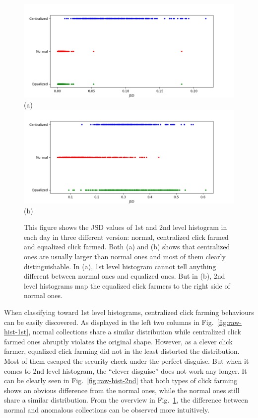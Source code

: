 \documentclass[10pt,conference,letterpaper]{IEEEtran}
\begin{document}
			\begin{figure}[!ht]
				\centering
				\includegraphics[width=\linewidth]{fig/RawOverview1st.png}
				(a)
				\includegraphics[width=\linewidth]{fig/RawOverview2nd.png}
				(b)
				\caption{This figure shows the JSD values of 1st and 2nd level histogram in each day in three different version: normal, centralized click farmed and equalized click farmed. Both (a) and (b) shows that centralized ones are usually larger than normal ones and most of them clearly distinguishable. In (a), 1st level histogram cannot tell anything different between normal ones and equalized ones. But in (b), 2nd level histograms map the equalized click farmers to the right side of normal ones.}
				\label{fig:raw-overview}
			\end{figure}
	
			When classifying toward 1st level histograms, centralized click farming behaviours can be easily discovered. As displayed in the left two columns in Fig.~\ref{fig:raw-hist-1st}, normal collections share a similar distribution while centralized click farmed ones abruptly violates the original shape. However, as a clever click farmer, equalized click farming did not in the least distorted the distribution. Most of them escaped the security check under the perfect disguise.
			But when it comes to 2nd level histogram, the ``clever disguise'' does not work any longer. It can be clearly seen in Fig.~\ref{fig:raw-hist-2nd} that both types of click farming shows an obvious difference from the normal ones, while the normal ones still share a similar distribution.
			From the overview in Fig.~\ref{fig:raw-overview}, the difference between normal and anomalous collections can be observed more intuitively.
	
\end{document}
